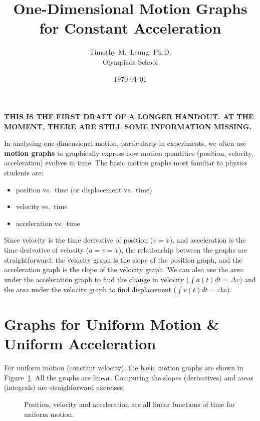\documentclass[11pt]{article}
\title{One-Dimensional Motion Graphs for Constant Acceleration}
\author{Timothy M.\ Leung, Ph.D.\\Olympiads School}
\date{\today}
\begin{document}
\maketitle

\textbf{THIS IS THE FIRST DRAFT OF A LONGER HANDOUT. AT THE MOMENT, THERE ARE
  STILL SOME INFORMATION MISSING.}

In analysing one-dimensional motion, particularly in experiments, we often use
\textbf{motion graphs} to graphically express how motion quantities (position,
velocity, acceleration) evolves in time. The basic motion graphs most familiar
to physics students are:
\begin{itemize}[noitemsep,topsep=0pt,leftmargin=15pt]
\item position vs.\ time (or displacement vs.\ time)
\item velocity vs.\ time
\item acceleration vs.\ time
\end{itemize}
Since velocity is the time derivative of position ($v=\dot{x}$), and
acceleration is the time derivative of velocity ($a=\dot{v}=\ddot{x}$), the
relationship between the graphs are straightforward: the velocity graph is the
slope of the position graph, and the acceleration graph is the slope of the
velocity graph. We can also use the area under the acceleration graph to find
the change in velocity ($\int a(t)dt=\Delta v$) and the area under the velocity
graph to find displacement ($\int v(t)dt=\Delta x$).

\section{Graphs for Uniform Motion \& Uniform Acceleration}
For uniform motion (constant velocity), the basic motion graphs are shown in
Figure~\ref{uniform-motion}. All the graphs are linear. Computing the slopes
(derivatives) and areas (integrals) are straighforward exercises.
\begin{figure}[!ht]
  \centering
  \hspace{.15in}
  \hspace{.15in}
  \caption{Position, velocity and acceleration are all linear functions of time
    for uniform motion.}
  \label{uniform-motion}
\end{figure}
\end{document}

